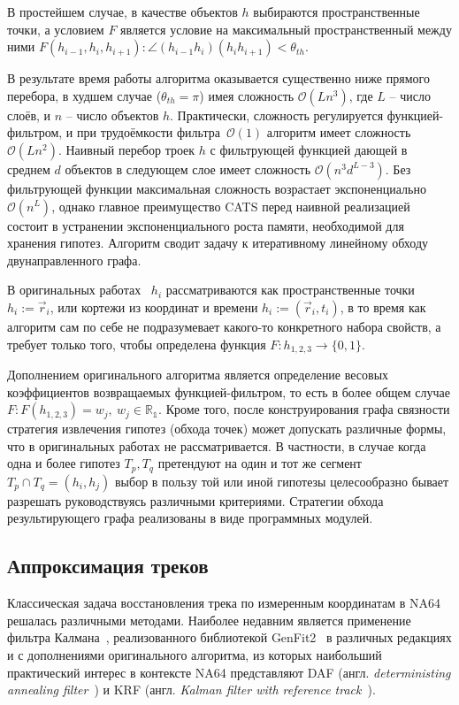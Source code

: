 В простейшем случае, в качестве объектов $h$ выбираются пространственные
точки, а условием $F$ является условие на максимальный пространственный
между ними $F(h_{i-1},h_{i},h_{i+1}): \angle(h_{i-1}h_i) (h_i h_{i+1}) < \theta_{th}$.

В результате время работы алгоритма оказывается существенно ниже
прямого перебора, в худшем случае ($\theta_{th} =\pi$) имея
сложность $\mathcal{O}(Ln^3)$, где $L$ -- число слоёв,
и $n$ -- число объектов $h$. Практически, сложность регулируется
функцией-фильтром, и при трудоёмкости фильтра~$\mathcal{O}(1)$ алгоритм
имеет сложность $\mathcal{O}(Ln^2)$. Наивный перебор троек $h$
с фильтрующей функцией дающей в среднем $d$ объектов в следующем слое
имеет сложность $\mathcal{O}(n^3 d^{L-3})$. Без фильтрующей функции
максимальная сложность возрастает экспоненциально $\mathcal{O}(n^L)$,
однако главное преимущество CATS перед наивной реализацией состоит
в устранении экспоненциального роста памяти, необходимой для хранения
гипотез. Алгоритм сводит задачу к итеративному линейному обходу
двунаправленного графа.

В оригинальных работах~\cite{catsc-JINR, catsc-discrete, catsc-nim, catsc-disto}
$h_i$ рассматриваются как пространственные точки $h_i:=\vec{r}_i$, или кортежи из
координат и времени $h_i:=(\vec{r}_i,t_i)$, в то время как алгоритм сам по себе
не подразумевает какого-то конкретного набора свойств, а требует
только того, чтобы определена функция $F:h_{1,2,3} \rightarrow \{0,1\}$.

Дополнением оригинального алгоритма является определение весовых
коэффициентов возвращаемых функцией-фильтром, то есть в более общем
случае $F: F(h_{1,2,3}) =w_j, ~w_j \in \mathbb{R_1}$. Кроме того, после
конструирования графа связности стратегия извлечения гипотез (обхода точек)
может допускать различные формы, что в оригинальных работах не
рассматривается. В частности, в случае когда одна и более гипотез $T_p, T_q$
претендуют на один и тот же сегмент $T_p \cap T_q = (h_i, h_j)$ выбор в пользу
той или иной гипотезы целесообразно бывает разрешать руководствуясь различными
критериями. Стратегии обхода результирующего графа реализованы в виде
программных модулей.

\subsection{Аппроксимация треков}

Классическая задача восстановления трека по измеренным
координатам в NA64 решалась различными методами.
Наиболее недавним является применение фильтра Калмана~\cite{kalman-1960},
реализованного библиотекой GenFit2~\cite{Genfit2_Rauch_2015}
в различных редакциях и с дополнениями оригинального алгоритма, из которых
наибольший практический интерес в контексте NA64
представляют
DAF (англ. \emph{deterministing annealing filter}~\cite{daf-track-fitting})
и KRF
(англ. \emph{Kalman filter with reference track}~\cite{krf-kalman-w-reference-track}).

